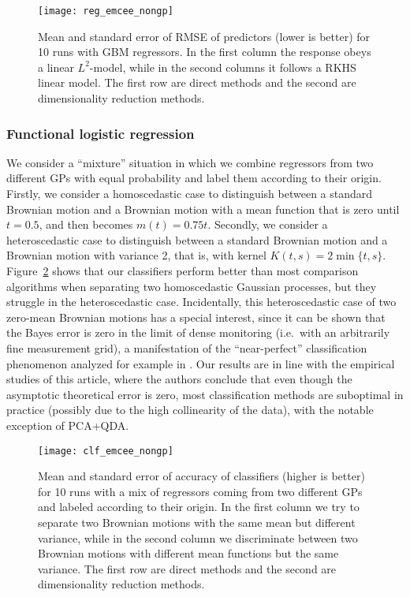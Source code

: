 \begin{figure}[ht!]
    \centering
    \texttt{[image: reg\_emcee\_nongp]}
    \caption{Mean and standard error of RMSE of predictors (lower is better) for 10 runs with GBM regressors. In the first column the response obeys a linear \(L^2\)-model, while in the second columns it follows a RKHS linear model. The first row are direct methods and the second are dimensionality reduction methods.}\label{fig:reg_emcee_nongp}
\end{figure}

\subsubsection*{Functional logistic regression}

We consider a ``mixture'' situation in which we combine regressors from two different GPs with equal probability and label them according to their origin. Firstly, we consider a homoscedastic case to distinguish between a standard Brownian motion and a Brownian motion with a mean function that is zero until \(t=0.5\), and then becomes \(m(t)=0.75t\). Secondly, we consider a heteroscedastic case to distinguish between a standard Brownian motion and a Brownian motion with variance 2, that is, with kernel \(K(t,s)=2\min\{t,s\}\). Figure~\ref{fig:clf_emcee_nongp} shows that our classifiers perform better than most comparison algorithms when separating two homoscedastic Gaussian processes, but they struggle in the heteroscedastic case. Incidentally, this heteroscedastic case of two zero-mean Brownian motions has a special interest, since it can be shown that the Bayes error is zero in the limit of dense monitoring (i.e.\ with an arbitrarily fine measurement grid), a manifestation of the ``near-perfect'' classification phenomenon analyzed for example in \citet{torrecilla2020optimal}. Our results are in line with the empirical studies of this article, where the authors conclude that even though the asymptotic theoretical error is zero, most classification methods are suboptimal in practice (possibly due to the high collinearity of the data), with the notable exception of PCA+QDA.

\begin{figure}[ht!]
    \centering
    \texttt{[image: clf\_emcee\_nongp]}
    \caption{Mean and standard error of accuracy of classifiers (higher is better) for 10 runs with a mix of regressors coming from two different GPs and labeled according to their origin. In the first column we try to separate two Brownian motions with the same mean but different variance, while in the second column we discriminate between two Brownian motions with different mean functions but the same variance. The first row are direct methods and the second are dimensionality reduction methods.}\label{fig:clf_emcee_nongp}
\end{figure}

